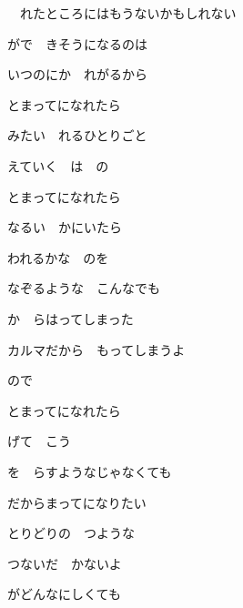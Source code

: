 　れたところにはもうないかもしれない

\bigskip

がで　きそうになるのは

いつのにか　れがるから

\bigskip

とまってになれたら

みたい　れるひとりごと

えていく　は　の

とまってになれたら

なるい　かにいたら

われるかな　のを

なぞるような　こんなでも

\bigskip

か　らはってしまった

カルマだから　もってしまうよ

ので

\bigskip

とまってになれたら

げて　こう

を　らすようなじゃなくても

だからまってになりたい

とりどりの　つような

つないだ　かないよ

がどんなにしくても
